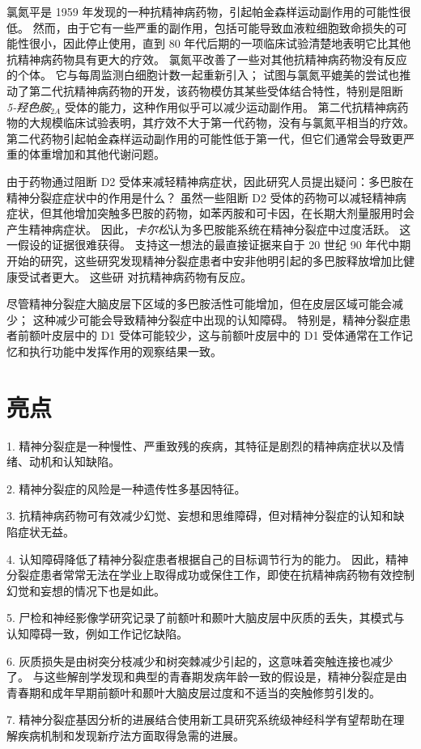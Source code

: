 氯氮平是 1959 年发现的一种抗精神病药物，引起帕金森样运动副作用的可能性很低。
然而，由于它有一些严重的副作用，包括可能导致血液粒细胞致命损失的可能性很小，因此停止使用，直到 80 年代后期的一项临床试验清楚地表明它比其他抗精神病药物具有更大的疗效。
氯氮平改善了一些对其他抗精神病药物没有反应的个体。
它与每周监测白细胞计数一起重新引入；
试图与氯氮平媲美的尝试也推动了第二代抗精神病药物的开发，该药物模仿其某些受体结合特性，特别是阻断 \textit{5-羟色胺}$_{2A}$ 受体的能力，这种作用似乎可以减少运动副作用。
第二代抗精神病药物的大规模临床试验表明，其疗效不大于第一代药物，没有与氯氮平相当的疗效。
第二代药物引起帕金森样运动副作用的可能性低于第一代，但它们通常会导致更严重的体重增加和其他代谢问题。


由于药物通过阻断 D2 受体来减轻精神病症状，因此研究人员提出疑问：多巴胺在精神分裂症症状中的作用是什么？
虽然一些阻断 D2 受体的药物可以减轻精神病症状，但其他增加突触多巴胺的药物，如苯丙胺和可卡因，在长期大剂量服用时会产生精神病症状。
因此，\textit{卡尔松}认为多巴胺能系统在精神分裂症中过度活跃。
这一假设的证据很难获得。
支持这一想法的最直接证据来自于 20 世纪 90 年代中期开始的研究，这些研究发现精神分裂症患者中安非他明引起的多巴胺释放增加比健康受试者更大。
这些研 对抗精神病药物有反应。


尽管精神分裂症大脑皮层下区域的多巴胺活性可能增加，但在皮层区域可能会减少；
这种减少可能会导致精神分裂症中出现的认知障碍。
特别是，精神分裂症患者前额叶皮层中的 D1 受体可能较少，这与前额叶皮层中的 D1 受体通常在工作记忆和执行功能中发挥作用的观察结果一致。



\section{亮点}

1. 精神分裂症是一种慢性、严重致残的疾病，其特征是剧烈的精神病症状以及情绪、动机和认知缺陷。


2. 精神分裂症的风险是一种遗传性多基因特征。


3. 抗精神病药物可有效减少幻觉、妄想和思维障碍，但对精神分裂症的认知和缺陷症状无益。


4. 认知障碍降低了精神分裂症患者根据自己的目标调节行为的能力。
因此，精神分裂症患者常常无法在学业上取得成功或保住工作，即使在抗精神病药物有效控制幻觉和妄想的情况下也是如此。


5. 尸检和神经影像学研究记录了前额叶和颞叶大脑皮层中灰质的丢失，其模式与认知障碍一致，例如工作记忆缺陷。


6. 灰质损失是由树突分枝减少和树突棘减少引起的，这意味着突触连接也减少了。
与这些解剖学发现和典型的青春期发病年龄一致的假设是，精神分裂症是由青春期和成年早期前额叶和颞叶大脑皮层过度和不适当的突触修剪引发的。


7. 精神分裂症基因分析的进展结合使用新工具研究系统级神经科学有望帮助在理解疾病机制和发现新疗法方面取得急需的进展。



